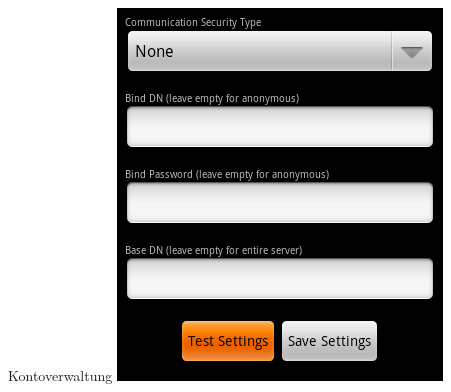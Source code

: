 \documentclass[hyperref={bookmarksopen=false}]{beamer}
\begin{document}
\begin{frame}[fragile]
\begin{block}{Kontoverwaltung}
	\vspace{1 cm}
	\includegraphics[scale=0.3]{Add_Account2.png}
	\end{block}
\end{frame}
\end{document}
